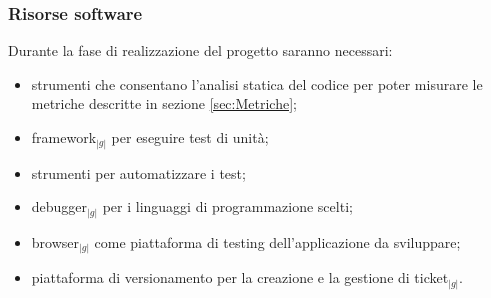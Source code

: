 {{	  \subsubsection{Risorse software}{
	      Durante la fase di realizzazione del progetto saranno necessari:
	      \begin{itemize}
		  \item strumenti che consentano l'analisi statica del codice per poter misurare le metriche descritte in sezione \ref{sec:Metriche};
		  \item framework$_{|g|}$ per eseguire test di unità;
		  \item strumenti per automatizzare i test;
		  \item debugger$_{|g|}$ per i linguaggi di programmazione scelti;
		  \item browser$_{|g|}$ come piattaforma di testing dell'applicazione da sviluppare;
		  \item piattaforma di versionamento per la creazione e la gestione di ticket$_{|g|}$.
	      \end{itemize}
	  }
    }
}
